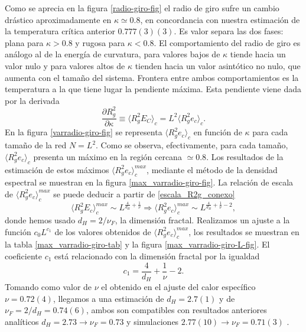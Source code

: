 Como se aprecia en la figura \ref{radio-giro-fig} el radio de giro sufre un
cambio drástico aproximadamente en $\kappa\simeq 0.8$, en concordancia con
nuestra estimación de la temperatura crítica anterior $0.777(3)(3)$. Es valor separa las dos
fases: plana para $\kappa> 0.8$ y rugosa  para $\kappa< 0.8$. El
comportamiento del radio de giro es análogo al de la energía de curvatura,
para valores bajos de $\kappa$ tiende hacia un valor nulo y para valores altos
de $\kappa$ tienden hacia un valor asintótico no nulo, que aumenta con el
tamaño del sistema. Frontera entre ambos comportamientos es la temperatura a
la que tiene lugar la pendiente máxima. Esta pendiente viene dada por la
derivada
\begin{equation}
\frac{\partial R_g^2}{\partial \kappa}\equiv\langle R_g^2E_C \rangle_c=L^2 \langle R_g^2e_c \rangle_c.
\end{equation}
En la figura \ref{varradio-giro-fig} se representa $\langle R_g^2e_c 
\rangle_c$ en función de $\kappa$ para cada tamaño de la red $N=L^2$. Como se observa, efectivamente, 
para cada tamaño, $\langle R_g^2e_c \rangle_c$ presenta un máximo en la región
cercana $\simeq 0.8$. Los resultados de la estimación de estos máximos
$\langle R_g^2e_c \rangle^{max}_c$, mediante el método de la densidad espectral se muestran en la figura
\ref{max_varradio-giro-fig}. La relación de escala de  $\langle R_g^2e_c
\rangle^{max}_c$ se puede deducir a partir de \eqref{escala_R2g_conexo}
\begin{equation}
\langle R_g^2E_c\rangle^{max}_c\sim
L^{\frac{4}{d_H}+\frac{1}{\nu}}\Rightarrow \langle R_g^2e_c\rangle^{max}_c\sim
L^{\frac{4}{d_H}+\frac{1}{\nu}-2},
\end{equation}
donde hemos usado $d_H=2/\nu_F$, la dimensión fractal. Realizamos un ajuste a
la función $c_0L^{c_1}$ de los valores obtenidos de 
$\langle R_g^2e_c\rangle^{max}_c$, los resultados se muestran en la tabla
\ref{max_varradio-giro-tab} y la figura \ref{max_varradio-giro-L-fig}. El coeficiente $c_1$ está relacionado con la
dimensión fractal por la igualdad
\begin{equation*}
c_1=\frac{4}{d_H}+\frac{1}{\nu}-2.
\end{equation*}
Tomando como valor de $\nu$ el obtenido en el ajuste del calor específico
$\nu= 0.72(4)$, llegamos a una estimación de $d_H=2.7(1)$ y de
$\nu_F=2/d_H=0.74(6)$, ambos son compatibles con resultados anteriores analíticos
$d_H=2.73\rightarrow \nu_F=0.73$ \cite{Doussal:nu} y simulaciones
$2.77(10)\rightarrow \nu_F=0.71(3)$ \cite{Espriu:MCRG}.



